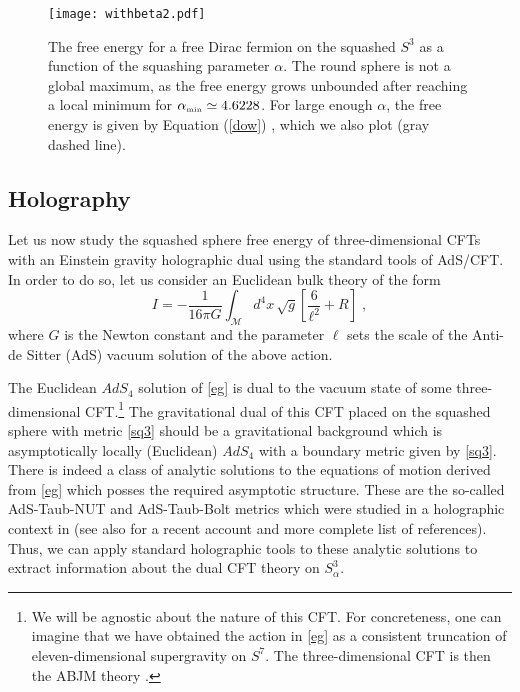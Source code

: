 \documentclass[12pt]{article}
\numberwithin{equation}{section}
\newcommand{\req}[1]{(\ref{#1})} %
\newcommand{\ssc}{\scriptscriptstyle}
\begin{document}
\begin{figure}[ht!]
	\centering
	\texttt{[image: withbeta2.pdf]}
	\caption{The free energy for a free Dirac fermion on the squashed $S^3$ as a function of the squashing parameter $\alpha$. The round sphere is not a global maximum, as the free energy grows unbounded after reaching a local minimum for $\alpha_{\rm \ssc min}\simeq  4.6228$. For large enough $\alpha$, the free energy is given by Equation \req{dow}  \cite{DeFrancia:2000xm}, which we also plot (gray dashed line). }\label{fig:3dfermion}
\end{figure}


\subsection{Holography}
\label{holo}

Let us now study the squashed sphere free energy of three-dimensional CFTs with an Einstein gravity holographic dual using the standard tools of AdS/CFT. In order to do so, let us consider an Euclidean bulk theory of the form
%
\begin{equation}\label{eg}
I=-\frac{1}{16\pi G} \int_{\mathcal{M}} d^4x\, \sqrt{g} \left[\frac{6}{\ell^2}+R \right]\;,
\end{equation}
%
where $G$ is the Newton constant and the parameter $\ell$ sets the scale of the Anti-de Sitter (AdS) vacuum solution of the above action.

The Euclidean $AdS_4$ solution of \eqref{eg} is dual to the vacuum state of some three-dimensional CFT.\footnote{We will be agnostic about the nature of this CFT. For concreteness, one can imagine that we have obtained the action in \eqref{eg} as a consistent truncation of eleven-dimensional supergravity on $S^7$. The three-dimensional CFT is then the ABJM theory \cite{Aharony:2008ug}.} The gravitational dual of this CFT placed on the squashed sphere with metric \eqref{sq3} should be a gravitational background which is asymptotically locally (Euclidean) $AdS_4$ with a boundary metric given by \eqref{sq3}. There is indeed a class of analytic solutions to the equations of motion derived from \eqref{eg} which posses the required asymptotic structure. These are the so-called AdS-Taub-NUT and AdS-Taub-Bolt metrics which were studied in a holographic context in \cite{Hawking:1998ct,Chamblin:1998pz} (see also \cite{Bobev:2016sap} for a recent account and more complete list of references). Thus, we can apply standard holographic tools to these analytic solutions to extract information about the dual CFT theory on $S_{\alpha}^3$. 
\end{document}
